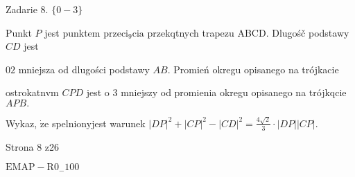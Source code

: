 \documentclass[a4paper,12pt]{article}
\begin{document}
Zadarie 8. $\{0-3\}$

Punkt $P$ jest punktem $\mathrm{p}\mathrm{r}\mathrm{z}\mathrm{e}\mathrm{c}\mathrm{i}_{9}\mathrm{c}\mathrm{i}\mathrm{a}$ przekqtnych trapezu ABCD. Dlugośč podstawy $CD$ jest

$0 2$ mniejsza od dlugości podstawy $AB$. Promień okregu opisanego na trójkacie

ostrokatnvm $CPD$ jest o 3 mniejszy od promienia okregu opisanego na trójkqcie $APB.$

Wykaz, $\dot{\mathrm{z}}\mathrm{e}$ spelnionyjest warunek $|DP|^{2}+|CP|^{2}-|CD|^{2}=\displaystyle \frac{4\sqrt{2}}{3}\cdot|DP| |CP|.$

Strona 8 z26

$\mathrm{E}\mathrm{M}\mathrm{A}\mathrm{P}-\mathrm{R}0_{-}100$
\end{document}
